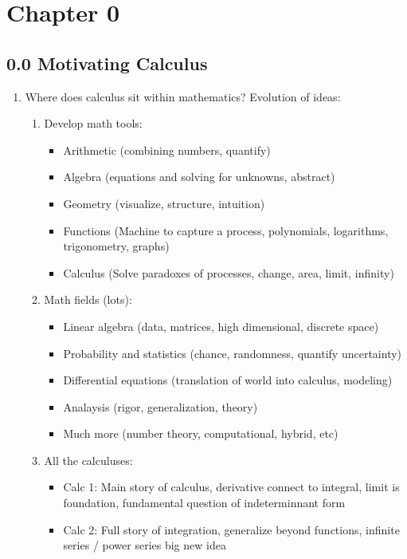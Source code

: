 \documentclass{article}
\begin{document}
\section{Chapter 0}
\subsection{0.0 Motivating Calculus}

\begin{enumerate}
\item Where does calculus sit within mathematics? Evolution of ideas:
\begin{enumerate}
\item Develop math tools:
\begin{itemize}
\item Arithmetic (combining numbers, quantify)
\item Algebra (equations and solving for unknowns, abstract)
\item Geometry (visualize, structure, intuition)
\item Functions (Machine to capture a process, polynomials, logarithms, trigonometry, graphs)
\item Calculus (Solve paradoxes of processes, change, area, limit, infinity)
\end{itemize}
\item Math fields (lots):
\begin{itemize}
\item Linear algebra (data, matrices, high dimensional, discrete space)
\item Probability and statistics (chance, randomness, quantify uncertainty)
\item Differential equations (translation of world into calculus, modeling)
\item Analaysis (rigor, generalization, theory)
\item Much more (number theory, computational, hybrid, etc)
\end{itemize}
\item All the calculuses:
\begin{itemize}
\item Calc 1: Main story of calculus, derivative connect to integral, limit is foundation, fundamental question of indeterminnant form
\item Calc 2: Full story of integration, generalize beyond functions, infinite series / power series big new idea

\end{itemize}
\end{enumerate}
\end{enumerate}
\end{document}
